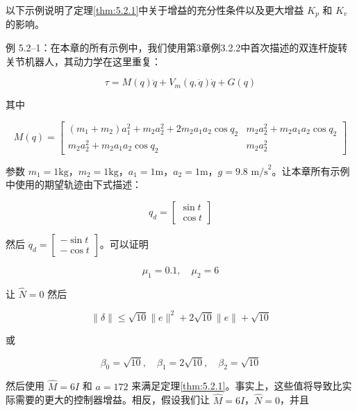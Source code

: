 \documentclass[UTF8,12pt,a4paper]{ctexart}
\begin{document}
以下示例说明了定理\ref{thm:5.2.1}中关于增益的充分性条件以及更大增益 $K_p$ 和 $K_v$ 的影响。

\begin{example}
例 5.2--1：在本章的所有示例中，我们使用第3章例3.2.2中首次描述的双连杆旋转关节机器人，其动力学在这里重复：

\begin{equation*}
\tau = M(q)\ddot{q} + V_m(q, \dot{q})\dot{q} + G(q)
\end{equation*}

其中

\begin{equation*}
M(q) = \begin{bmatrix}
(m_1 + m_2)a_1^2 + m_2 a_2^2 + 2m_2 a_1 a_2 \cos q_2 & m_2 a_2^2 + m_2 a_1 a_2 \cos q_2 \\
m_2 a_2^2 + m_2 a_1 a_2 \cos q_2 & m_2 a_2^2
\end{bmatrix}
\end{equation*}

参数 $m_1 = 1\text{kg}$，$m_2 = 1\text{kg}$，$a_1 = 1\text{m}$，$a_2 = 1\text{m}$，$g = 9.8\text{ m/s}^2$。让本章所有示例中使用的期望轨迹由下式描述：

\begin{equation*}
q_d = \begin{bmatrix} \sin t \\ \cos t \end{bmatrix}
\end{equation*}

然后 $\ddot{q}_d = \begin{bmatrix} -\sin t \\ -\cos t \end{bmatrix}$。可以证明

\begin{equation*}
\mu_1 = 0.1, \quad \mu_2 = 6
\end{equation*}

让 $\hat{N} = 0$ 然后

\begin{equation*}
\|\delta\| \leq \sqrt{10}\|e\|^2 + 2\sqrt{10}\|e\| + \sqrt{10}
\end{equation*}

或

\begin{equation*}
\beta_0 = \sqrt{10}, \quad \beta_1 = 2\sqrt{10}, \quad \beta_2 = \sqrt{10}
\end{equation*}

然后使用 $\hat{M} = 6I$ 和 $a = 172$ 来满足定理\ref{thm:5.2.1}。事实上，这些值将导致比实际需要的更大的控制器增益。相反，假设我们让 $\hat{M} = 6I$，$\hat{N} = 0$，并且


\end{example}
\end{document}
